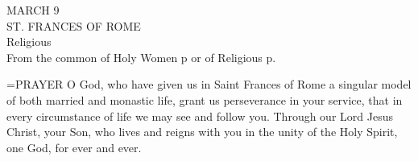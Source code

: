 \begin{center}\normalsize MARCH 9\\
\footnotesize ST. FRANCES OF ROME\\
\footnotesize Religious\\
\footnotesize From the common of Holy Women p    or of Religious p.   \\
\end{center}

\hangindent=\parindent \small{PRAYER 
O God, who have given us in Saint Frances of Rome
a singular model of both married and monastic life,
grant us perseverance in your service,
that in every circumstance of life we may see and follow you.
Through our Lord Jesus Christ, your Son,
who lives and reigns with you in the unity of the Holy Spirit,
one God, for ever and ever.\\}
 
